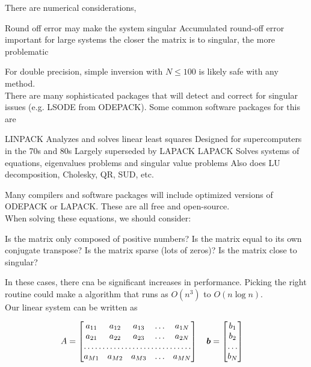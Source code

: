 \documentclass[]{article}
\begin{document}
There are numerical considerations,
\begin{outline}
	\1 Round off error may make the system singular
	\1 Accumulated round-off error
		\2 important for large systems
		\2 the closer the matrix is to singular, the more problematic
\end{outline}\bigbreak

For double precision, simple inversion with $N\leq 100$ is likely safe with any method.\\

There are many sophisticated packages that will detect and correct for singular issues (e.g. LSODE from ODEPACK). Some common software packages for this are
\begin{outline}
		\1 LINPACK
			\2 Analyzes and solves linear least squares
			\2 Designed for supercomputers in the 70s and 80s
			\2 Largely superseded by LAPACK
		\1 LAPACK
			\2 Solves systems of equations, eigenvalues problems and singular value problems
			\2 Also does LU decomposition, Cholesky, QR, SUD, etc.
\end{outline}\bigbreak

Many compilers and software packages will include optimized versions of ODEPACK or LAPACK. These are all free and open-source.\\

When solving these equations, we should consider:

\begin{outline}
	\1 Is the matrix only composed of positive numbers?
	\1 Is the matrix equal to its own conjugate transpose?
	\1 Is the matrix sparse (lots of zeros)?
	\1 Is the matrix close to singular?
\end{outline}\bigbreak

In these cases, there cna be significant increases in performance. Picking the right routine could make a algorithm that runs as $O(n^3)$ to $O(n\log n)$.\\

Our linear system can be written as

\[
A=\begin{bmatrix}
	a_{11}       & a_{12} & a_{13} & \dots & a_{1N} \\
	a_{21}       & a_{22} & a_{23} & \dots & a_{2N} \\
	\hdotsfor{5} \\
	a_{M1}       & a_{M2} & a_{M3} & \dots & a_{MN}
\end{bmatrix}\quad \bm{b} = \begin{bmatrix}
	b_{1}      \\
	b_{2}      \\
	\hdotsfor{1} \\
	b_{N}      
\end{bmatrix}\quad
\]
\end{document}
